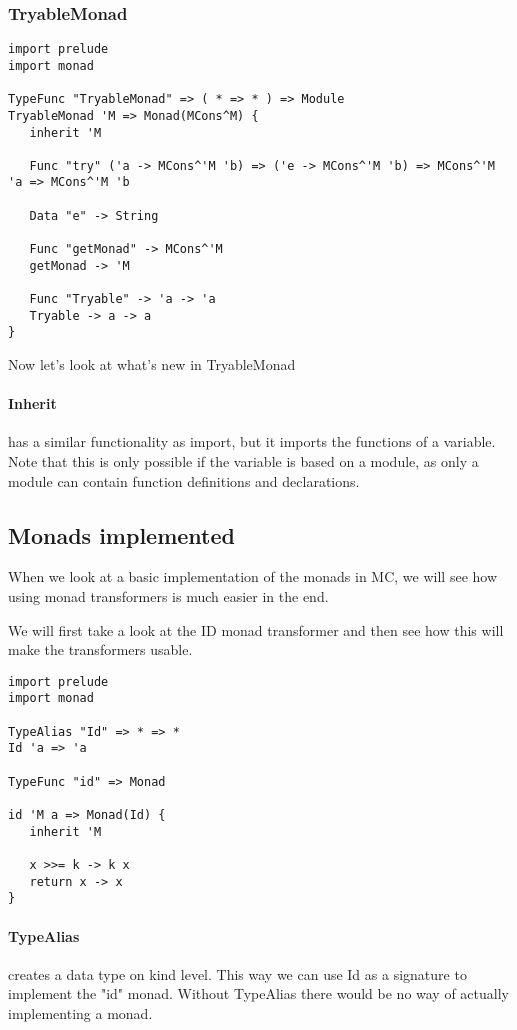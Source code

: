 \subsubsection{TryableMonad}

\begin{lstlisting}
import prelude
import monad

TypeFunc "TryableMonad" => ( * => * ) => Module
TryableMonad 'M => Monad(MCons^M) {
   inherit 'M

   Func "try" ('a -> MCons^'M 'b) => ('e -> MCons^'M 'b) => MCons^'M 'a => MCons^'M 'b

   Data "e" -> String

   Func "getMonad" -> MCons^'M
   getMonad -> 'M

   Func "Tryable" -> 'a -> 'a
   Tryable -> a -> a
}
\end{lstlisting}

Now let's look at what's new in TryableMonad

\paragraph{Inherit}
has a similar functionality as import, but it imports the functions of a variable.
Note that this is only possible if the variable is based on a module, as only a module can contain function definitions and declarations.


\subsection{Monads implemented}

When we look at a basic implementation of the monads in MC, we will see how using monad transformers is much easier in the end.

We will first take a look at the ID monad transformer and then see how this will make the transformers usable.

\begin{lstlisting}
import prelude
import monad

TypeAlias "Id" => * => *
Id 'a => 'a

TypeFunc "id" => Monad

id 'M a => Monad(Id) {
   inherit 'M

   x >>= k -> k x
   return x -> x
}
\end{lstlisting}

\paragraph{TypeAlias}
creates a data type on kind level.
This way we can use Id as a signature to implement the "id" monad.
Without TypeAlias there would be no way of actually implementing a monad.

